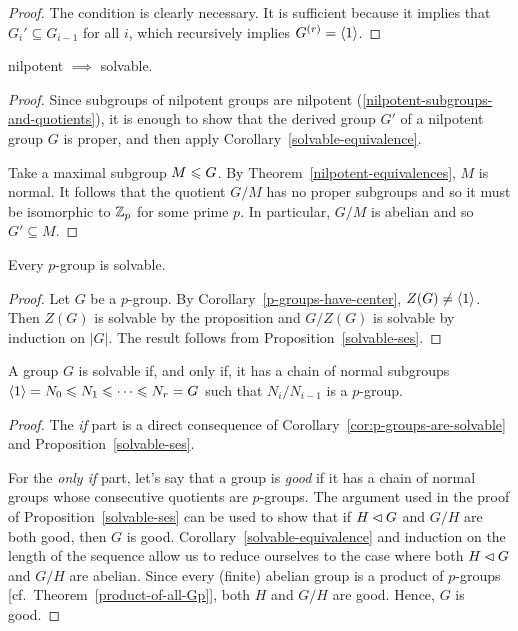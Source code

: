 \begin{proof} The condition is clearly necessary. It is sufficient because it implies that $G_i'\subseteq G_{i-1}$ for all $i$, which recursively implies $G^{(r)}=\langle1\rangle$.  \end{proof}

\begin{cor}\label{nilpotent-implies-solvable}
    nilpotent $\implies$ solvable.
\end{cor}

\begin{proof} Since subgroups of nilpotent groups are nilpotent (\ref{nilpotent-subgroups-and-quotients}), it is enough to show that the derived group $G'$ of a nilpotent group $G$ is proper, and then apply Corollary~\ref{solvable-equivalence}.

Take a maximal subgroup $M\leqslant G$. By Theorem~\ref{nilpotent-equivalences}, $M$ is normal. It follows that the quotient $G/M$ has no proper subgroups and so it must be isomorphic to $\mathbb{Z}_p$ for some prime $p$. In particular, $G/M$ is abelian and so $G'\subseteq M$.  \end{proof}

\begin{cor}\label{cor:p-groups-are-solvable}
    Every\/ $p$-group is solvable.
\end{cor}

\begin{proof}
    Let $G$ be a $p$-group. By Corollary~\ref{p-groups-have-center}, $Z(G)\ne\langle1\rangle$. Then $Z(G)$ is solvable by the proposition and $G/Z(G)$ is solvable by induction on $|G|$. The result follows from Proposition~\ref{solvable-ses}.
\end{proof}

\begin{cor}\label{cor:solvable-iff-p-group-chain}
    A group\/ $G$ is solvable if, and only if, it has a chain of normal subgroups\/ $\langle1\rangle=N_0\leqslant N_1\leqslant\cdots\leqslant N_r=G$ such that\/ $N_i/N_{i-1}$ is a\/ $p$-group.
\end{cor}

\begin{proof}
    The \textit{if\/} part is a direct consequence of Corollary~\ref{cor:p-groups-are-solvable} and Proposition~\ref{solvable-ses}.

    For the \textit{only if\/} part, let's say that a group is \textsl{good\/} if it has a chain of normal groups whose consecutive quotients are $p$-groups. The argument used in the proof of Proposition~\ref{solvable-ses} can be used to show that if $H\lhd G$ and $G/H$ are both good, then $G$ is good. Corollary~\ref{solvable-equivalence} and induction on the length of the sequence allow us to reduce ourselves to the case where both $H\lhd G$ and $G/H$ are abelian. Since every (finite) abelian group is a product of $p$-groups [cf.~Theorem~\ref{product-of-all-Gp}], both $H$ and $G/H$ are good. Hence, $G$ is good.
\end{proof}

